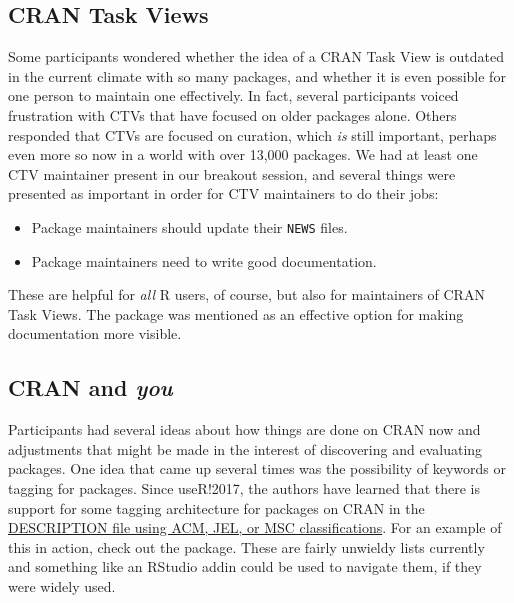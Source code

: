 \hypertarget{cran-task-views}{%
\subsection{CRAN Task Views}\label{cran-task-views}}

Some participants wondered whether the idea of a CRAN Task View
\citep{ctvs} is outdated in the current climate with so many packages,
and whether it is even possible for one person to maintain one
effectively. In fact, several participants voiced frustration with CTVs
that have focused on older packages alone. Others responded that CTVs
are focused on curation, which \emph{is} still important, perhaps even
more so now in a world with over 13,000 packages. We had at least one
CTV maintainer present in our breakout session, and several things were
presented as important in order for CTV maintainers to do their jobs:

\begin{itemize}
\tightlist
\item
  Package maintainers should update their \texttt{NEWS} files.
\item
  Package maintainers need to write good documentation.
\end{itemize}

These are helpful for \emph{all} R users, of course, but also for
maintainers of CRAN Task Views. The  \citep{pkgdown}
package was mentioned as an effective option for making documentation
more visible.

\hypertarget{cran-and-you}{%
\subsection{\texorpdfstring{CRAN and
\emph{you}}{CRAN and you}}\label{cran-and-you}}

Participants had several ideas about how things are done on CRAN now and
adjustments that might be made in the interest of discovering and
evaluating packages. One idea that came up several times was the
possibility of keywords or tagging for packages. Since useR!2017, the
authors have learned that there is support for some tagging architecture
for packages on CRAN in the
\href{https://cran.r-project.org/doc/manuals/r-release/R-exts.html\#The-DESCRIPTION-file}{DESCRIPTION
file using ACM, JEL, or MSC classifications}. For an example of this in
action, check out the  \citep{lfe} package. These are
fairly unwieldy lists currently and something like an RStudio addin
could be used to navigate them, if they were widely used.


